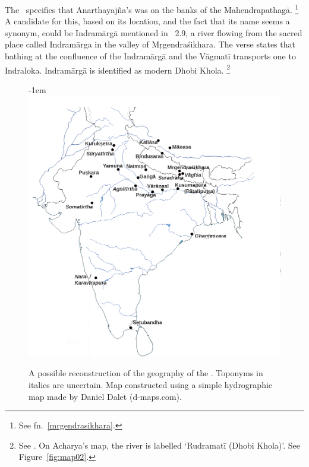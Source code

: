 The \VSS\ specifies that Anarthayajña's  was
on the banks of the Mahendrapathagā.%
		 \footnote{See fn.~\ref{mrgendrasikhara}.}
A candidate for this, based on its location, and the fact that its name seems a synonym,
could be Indramārgā mentioned in \Vagmati\ 2.9,
a river flowing from the sacred place 
called Indramārga in the valley of Mṛgendraśikhara.
 The verse states that bathing at the confluence of the
Indramārgā and the Vāgmatī transports one to Indraloka. Indramārgā
is identified as modern Dhobi Khola.%
        \footnote{See . On
                Acharya's map, the river is labelled `Rudramatī (Dhobi Khola)'. See
               Figure~\ref{fig:map02}.}


\begin{figure}[!]
\leftskip-1em\includegraphics[scale=.35]{images/simplemap.png}
\caption[Geography of the \VSS]{A possible reconstruction of the  geography of the \VSS. Toponyms in italics are uncertain. Map constructed using a simple hydrographic map made by Daniel Dalet (d-maps.com).\label{fig:map01}}
\end{figure}

